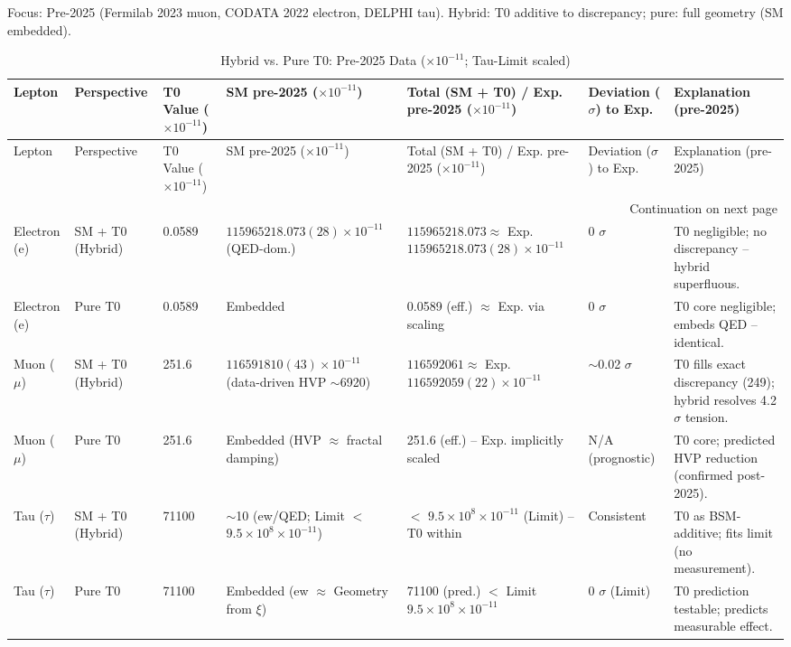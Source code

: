 \documentclass[12pt,a4paper]{article}
\begin{document}
	Focus: Pre-2025 (Fermilab 2023 muon, CODATA 2022 electron, DELPHI tau). Hybrid: T0 additive to discrepancy; pure: full geometry (SM embedded).
	
	\begin{longtable}{p{1.3cm}p{2cm}p{1cm}p{3.5cm}p{3cm}p{1.8cm}p{2.8cm}}
		\caption{Hybrid vs. Pure T0: Pre-2025 Data ($ \times 10^{-11}$; Tau-Limit scaled)} \label{tab:hybrid_pure}\\
		\toprule
		Lepton & Perspective & T0 Value ($ \times 10^{-11}$) & SM pre-2025 ($ \times 10^{-11}$) & Total (SM + T0) / Exp. pre-2025 ($ \times 10^{-11}$) & Deviation ($\sigma$) to Exp. & Explanation (pre-2025) \\
		\midrule
		\endfirsthead
		
		\toprule
		Lepton & Perspective & T0 Value ($ \times 10^{-11}$) & SM pre-2025 ($ \times 10^{-11}$) & Total (SM + T0) / Exp. pre-2025 ($ \times 10^{-11}$) & Deviation ($\sigma$) to Exp. & Explanation (pre-2025) \\
		\midrule
		\endhead
		
		\bottomrule
		\multicolumn{7}{r}{Continuation on next page} \\
		\endfoot
		
		Electron (e) & SM + T0 (Hybrid) & 0.0589 & $115965218.073(28) \times 10^{-11}$ (QED-dom.) & $115965218.073 \approx$ Exp. $115965218.073(28) \times 10^{-11}$ & 0 $\sigma$ & T0 negligible; no discrepancy -- hybrid superfluous. \\
		Electron (e) & Pure T0 & 0.0589 & Embedded & 0.0589 (eff.) $\approx$ Exp. via scaling & 0 $\sigma$ & T0 core negligible; embeds QED -- identical. \\
		Muon ($\mu$) & SM + T0 (Hybrid) & 251.6 & $116591810(43) \times 10^{-11}$ (data-driven HVP $\sim$6920) & $116592061 \approx$ Exp. $116592059(22) \times 10^{-11}$ & $\sim$0.02 $\sigma$ & T0 fills exact discrepancy (249); hybrid resolves 4.2$\sigma$ tension. \\
		Muon ($\mu$) & Pure T0 & 251.6 & Embedded (HVP $\approx$ fractal damping) & 251.6 (eff.) -- Exp. implicitly scaled & N/A (prognostic) & T0 core; predicted HVP reduction (confirmed post-2025). \\
		Tau ($\tau$) & SM + T0 (Hybrid) & 71100 & $\sim$10 (ew/QED; Limit $<$ $9.5\times10^{8} \times 10^{-11}$) & $<$ $9.5\times10^{8} \times 10^{-11}$ (Limit) -- T0 within & Consistent & T0 as BSM-additive; fits limit (no measurement). \\
		Tau ($\tau$) & Pure T0 & 71100 & Embedded (ew $\approx$ Geometry from $\xi$) & 71100 (pred.) $<$ Limit $9.5\times10^{8} \times 10^{-11}$ & 0 $\sigma$ (Limit) & T0 prediction testable; predicts measurable effect. \\
	\end{longtable}
	
\end{document}
